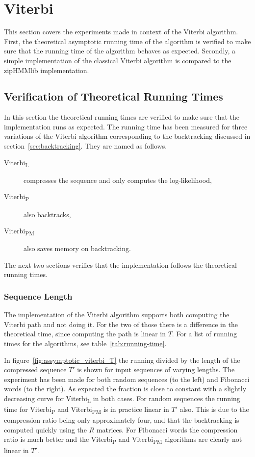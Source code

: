 \section{Viterbi}

This section covers the experiments made in context of the Viterbi algorithm.
First, the theoretical asymptotic running time of the algorithm is verified to
make sure that the running time of the algorithm behaves as expected. Secondly,
a simple implementation of the classical Viterbi algorithm is compared to the
zipHMMlib implementation.

\subsection{Verification of Theoretical Running Times}
\label{sec:theor-runn-times}

In this section the theoretical running times are verified to make sure that
the implementation runs as expected. The running time has been measured for
three variations of the Viterbi algorithm corresponding to the backtracking
discussed in section~\ref{sec:backtracking}. They are named as follows.
\begin{description}
\item[Viterbi\textsubscript{L}] compresses the sequence and only computes the
  log-likelihood,
\item[Viterbi\textsubscript{P}] also backtracks,
\item[Viterbi\textsubscript{PM}] also saves memory on backtracking.
\end{description}
The next two sections verifies that the implementation follows the theoretical
running times.

\subsubsection{Sequence Length}

The implementation of the Viterbi algorithm supports both computing the Viterbi
path and not doing it. For the two of those there is a difference in the
theoretical time, since computing the path is linear in $T$. For a list of
running times for the algorithms, see table~\ref{tab:running-time}.

In figure~\ref{fig:assymptotic_viterbi_T} the running divided by the length of
the compressed sequence $T'$ is shown for input sequences of varying lengths.
The experiment has been made for both random sequences (to the left) and
Fibonacci words (to the right). As expected the fraction is close to constant
with a slightly decreasing curve for Viterbi\textsubscript{L} in both cases.
For random sequences the running time for Viterbi\textsubscript{P} and
Viterbi\textsubscript{PM} is in practice linear in $T'$ also. This is due to
the compression ratio being only approximately four, and that the backtracking
is computed quickly using the $R$ matrices. For Fibonacci words the compression
ratio is much better and the Viterbi\textsubscript{P} and
Viterbi\textsubscript{PM} algorithms are clearly not linear in $T'$.

